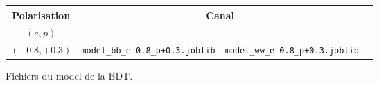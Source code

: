 

\begin{figure}[!ht]
	\centering
	\begin{tabular}{ | c | c | c | c | }
		\hline
		Polarisation & \multicolumn{2}{c|}{Canal} \\
		\hline
		$(e,p)$ & \bb &  \WW \\
		\hline \cline{2-3}
		$(-0.8, +0.3)$ & \verb|model_bb_e-0.8_p+0.3.joblib| & \verb|model_ww_e-0.8_p+0.3.joblib| \\
		\hline
	\end{tabular}
	\label{files:model}
	\caption{Fichiers du model de la BDT.}
\end{figure}